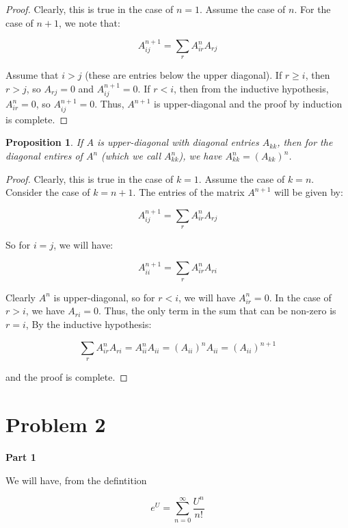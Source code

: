 \documentclass[10pt, oneside]{article}
\newtheorem{prop}{Proposition}
\begin{document}
    \begin{proof}
      Clearly, this is true in the case of $n = 1$. Assume the case of $n$. For the case of $n + 1$, we note that:

      $$A_{ij}^{n + 1} = \displaystyle\sum_{r} A_{ir}^{n} A_{rj}$$

      Assume that $i > j$ (these are entries below the upper diagonal). If $r \geq i$, then $r > j$, so $A_{rj} = 0$ and $A_{ij}^{n + 1} = 0$. If $r < i$, then
      from the inductive hypothesis, $A_{ir}^{n} = 0$, so $A_{ij}^{n + 1} = 0$. Thus, $A^{n + 1}$ is upper-diagonal and the proof by induction is complete.
    \end{proof}

    \begin{prop}
      If $A$ is upper-diagonal with diagonal entries $A_{kk}$, then for the diagonal entires of $A^{n}$ (which we call $A_{kk}^n$), we have $A_{kk}^{n} = (A_{kk})^n$.
      \end{prop}

    \begin{proof}
    Clearly, this is true in the case of $k = 1$. Assume the case of $k = n$. Consider the case of $k = n + 1$. The entries of the matrix $A^{n + 1}$ will be given by:

    $$A_{ij}^{n + 1} = \displaystyle\sum_{r} A_{ir}^{n} A_{rj}$$

    So for $i = j$, we will have:

    $$A_{ii}^{n + 1} = \displaystyle\sum_{r} A_{ir}^{n} A_{ri}$$

    Clearly $A^n$ is upper-diagonal, so for $r < i$, we will have $A_{ir}^{n} = 0$. In the case of $r > i$, we have $A_{ri} = 0$. Thus, the only
    term in the sum that can be non-zero is $r = i$, By the inductive hypothesis:

    $$\displaystyle\sum_{r} A_{ir}^{n} A_{ri} = A_{ii}^{n} A_{ii} = (A_{ii})^n A_{ii} = (A_{ii})^{n + 1}$$

    and the proof is complete.
    \end{proof}

    \section{Problem 2}

    \textbf{Part 1}
    \newline

    We will have, from the defintition

    $$e^U = \displaystyle\sum_{n = 0}^{\infty} \frac{U^n}{n!}$$
\end{document}
